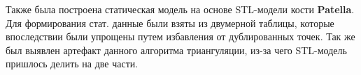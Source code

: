 \documentclass[a4paper, 12pt]{article}   	%
\begin{document}
    Также была построена статическая модель на основе STL-модели кости \textbf{Patella}. Для формирования стат. данные были взяты из двумерной таблицы, которые впоследствии были упрощены путем избавления от дублированных точек. Так же был выявлен артефакт данного алгоритма триангуляции, из-за чего STL-модель пришлось делить на две части.

\newpage

 
\end{document}
